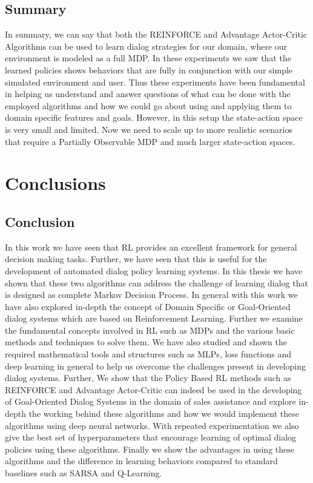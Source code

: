 \documentclass[12pt]{extarticle}
\numberwithin{equation}{section}
\begin{document}
	
	\subsection{Summary}
	In summary, we can say that both the REINFORCE and Advantage Actor-Critic Algorithms can be used to learn dialog strategies for our domain, where our environment is modeled as a full MDP. In these experiments we saw that the learned policies shows behaviors that are fully in conjunction with our simple simulated environment and user. Thus these experiments have been fundamental in helping us understand and answer questions of what can be done with the employed algorithms and how we could go about using and applying them to domain specific features and goals. However, in this setup the state-action space is very small and limited. Now we need to scale up to more realistic scenarios that require a Partially Observable MDP and much larger state-action spaces.
	\clearpage
	\section{Conclusions}
	\subsection{Conclusion}
	In this work we have seen that RL provides an excellent framework for general decision making tasks. Further, we have seen that this is useful for the development of automated dialog policy learning systems. In this thesis we have shown that these two algorithms can address the challenge of learning dialog that is designed as complete Markov Decision Process.
	In general with this work we have also explored in-depth the concept of Domain Specific or Goal-Oriented dialog systems which are based on Reinforcement Learning. Further we examine the fundamental concepts involved in RL such as MDPs and the various basic methods and techniques to solve them. We have also studied and shown the required mathematical tools and structures such as MLPs, loss functions and deep learning in general to help us overcome the challenges present in developing dialog systems.
	Further, We show that the Policy Based RL methods such as REINFORCE and Advantage Actor-Critic can indeed be used in the developing of Goal-Oriented Dialog Systems in the domain of sales assistance and explore in-depth the working behind these algorithms and how we would implement these algorithms using deep neural networks. With repeated experimentation we also give the best set of hyperparameters that encourage learning of optimal dialog policies using these algorithms. Finally we show the advantages in using these algorithms and the difference in learning behaviors compared to standard baselines such as SARSA and Q-Learning.
\end{document}
